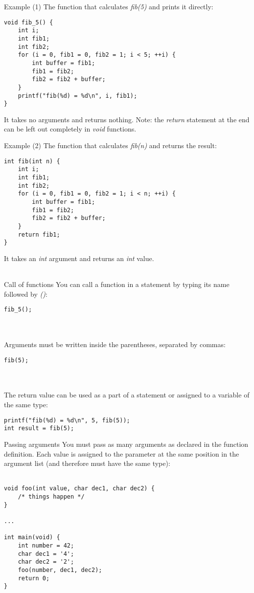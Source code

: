 \begin{frame}[fragile]{Example (1)}
	The function that calculates \textit{fib(5)} and prints it directly:
	\begin{lstlisting}
void fib_5() {
	int i;
	int fib1;
	int fib2;
	for (i = 0, fib1 = 0, fib2 = 1; i < 5; ++i) {
		int buffer = fib1;
		fib1 = fib2;
		fib2 = fib2 + buffer;
	}
	printf("fib(%d) = %d\n", i, fib1);
}
\end{lstlisting}
	It takes no arguments and returns nothing.
	Note: the \textit{return} statement at the end can be left out completely in \textit{void} functions.
\end{frame}
\begin{frame}[fragile]{Example (2)}
	The function that calculates \textit{fib(n)} and returns the result:
	\begin{lstlisting}
int fib(int n) {
	int i;
	int fib1;
	int fib2;
	for (i = 0, fib1 = 0, fib2 = 1; i < n; ++i) {
		int buffer = fib1;
		fib1 = fib2;
		fib2 = fib2 + buffer;
	}
	return fib1;
}
\end{lstlisting}
		It takes an \textit{int} argument and returns an \textit{int} value.\\\ 
\end{frame}
\begin{frame}[fragile]{Call of functions}
	You can call a function in a statement by typing its name followed by \textit{()}:
	\begin{lstlisting}[numbers=none]
fib_5();
\end{lstlisting} \ \\ \ \\
	Arguments must be written inside the parentheses, separated by commas:
	\begin{lstlisting}[numbers=none]
fib(5);
\end{lstlisting} \ \\ \ \\
	The return value can be used as a part of a statement or assigned to a variable of the same type:
	\begin{lstlisting}[numbers=none]
printf("fib(%d) = %d\n", 5, fib(5));
int result = fib(5);
\end{lstlisting}
\end{frame}
\begin{frame}[fragile]{Passing arguments}
	You must pass as many arguments as declared in the function definition. Each value is assigned to the parameter at the same position in the argument list (and therefore must have the same type): \ \\ \ \\
	\begin{lstlisting}
void foo(int value, char dec1, char dec2) {
	/* things happen */
}

...

int main(void) {
	int number = 42;
	char dec1 = '4';
	char dec2 = '2';
	foo(number, dec1, dec2);
	return 0;
}
\end{lstlisting}
\end{frame}
